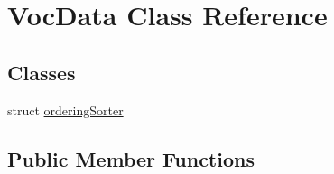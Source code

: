 \hypertarget{classVocData}{\section{Voc\-Data Class Reference}
\label{classVocData}
}
\subsection*{Classes}
\begin{DoxyCompactItemize}
\item 
struct \hyperlink{structVocData_1_1orderingSorter}{ordering\-Sorter}
\end{DoxyCompactItemize}
\subsection*{Public Member Functions}
